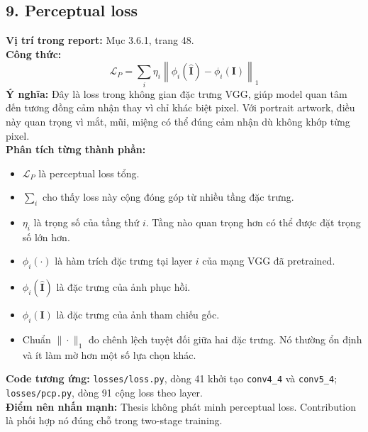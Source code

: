 \documentclass[12pt,a4paper]{article}
\begin{document}
\subsection*{9. Perceptual loss}
\textbf{Vị trí trong report:} Mục 3.6.1, trang 48.\\
\textbf{Công thức:}
\[
\mathcal{L}_{P} = \sum_{i}\eta_i \left\|\phi_i(\hat{\mathbf{I}})-\phi_i(\mathbf{I})\right\|_1
\]
\textbf{Ý nghĩa:} Đây là loss trong không gian đặc trưng VGG, giúp model quan tâm đến tương đồng cảm nhận thay vì chỉ khác biệt pixel. Với portrait artwork, điều này quan trọng vì mắt, mũi, miệng có thể đúng cảm nhận dù không khớp từng pixel.\\
\textbf{Phân tích từng thành phần:}
\begin{itemize}[leftmargin=1.5em]
\item $\mathcal{L}_{P}$ là perceptual loss tổng.
\item $\sum_i$ cho thấy loss này cộng đóng góp từ nhiều tầng đặc trưng.
\item $\eta_i$ là trọng số của tầng thứ $i$. Tầng nào quan trọng hơn có thể được đặt trọng số lớn hơn.
\item $\phi_i(\cdot)$ là hàm trích đặc trưng tại layer $i$ của mạng VGG đã pretrained.
\item $\phi_i(\hat{\mathbf{I}})$ là đặc trưng của ảnh phục hồi.
\item $\phi_i(\mathbf{I})$ là đặc trưng của ảnh tham chiếu gốc.
\item Chuẩn $\|\cdot\|_1$ đo chênh lệch tuyệt đối giữa hai đặc trưng. Nó thường ổn định và ít làm mờ hơn một số lựa chọn khác.
\end{itemize}
\textbf{Code tương ứng:} \texttt{losses/loss.py}, dòng 41 khởi tạo \texttt{conv4\_4} và \texttt{conv5\_4}; \texttt{losses/pcp.py}, dòng 91 cộng loss theo layer.\\
\textbf{Điểm nên nhấn mạnh:} Thesis không phát minh perceptual loss. Contribution là phối hợp nó đúng chỗ trong two-stage training.
\end{document}
